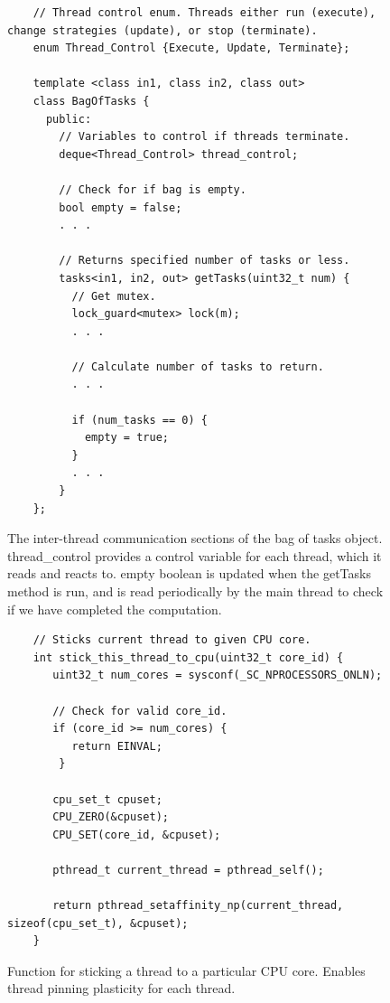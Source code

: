 \begin{figure}
	\begin{lstlisting}
	// Thread control enum. Threads either run (execute), change strategies (update), or stop (terminate).
	enum Thread_Control {Execute, Update, Terminate};

	template <class in1, class in2, class out>
	class BagOfTasks {
	  public:
	    // Variables to control if threads terminate.
	    deque<Thread_Control> thread_control;

	    // Check for if bag is empty.
	    bool empty = false;
	    . . .

	    // Returns specified number of tasks or less. 
	    tasks<in1, in2, out> getTasks(uint32_t num) {
	      // Get mutex. 
	      lock_guard<mutex> lock(m);
		  . . .

		  // Calculate number of tasks to return.
		  . . .

		  if (num_tasks == 0) {
		    empty = true;
	      }
		  . . .
		}
	};
	\end{lstlisting}

	\caption{The inter-thread communication sections of the bag of tasks object. thread\_control provides a control variable for each thread, which it reads and reacts to. empty boolean is updated when the getTasks method is run, and is read periodically by the main thread to check if we have completed the computation.}
	\label{fig:implementation_bot_comms}
\end{figure}



\begin{figure}
	\begin{lstlisting}
	// Sticks current thread to given CPU core.
	int stick_this_thread_to_cpu(uint32_t core_id) {
	   uint32_t num_cores = sysconf(_SC_NPROCESSORS_ONLN);

	   // Check for valid core_id.
	   if (core_id >= num_cores) {
	      return EINVAL;
	    }

	   cpu_set_t cpuset;
	   CPU_ZERO(&cpuset);
	   CPU_SET(core_id, &cpuset);

	   pthread_t current_thread = pthread_self();    

	   return pthread_setaffinity_np(current_thread, sizeof(cpu_set_t), &cpuset);
	}
	\end{lstlisting}

	\caption{Function for sticking a thread to a particular CPU core. Enables thread pinning plasticity for each thread.}
	\label{fig:implementation_thread_pinning}
\end{figure}



